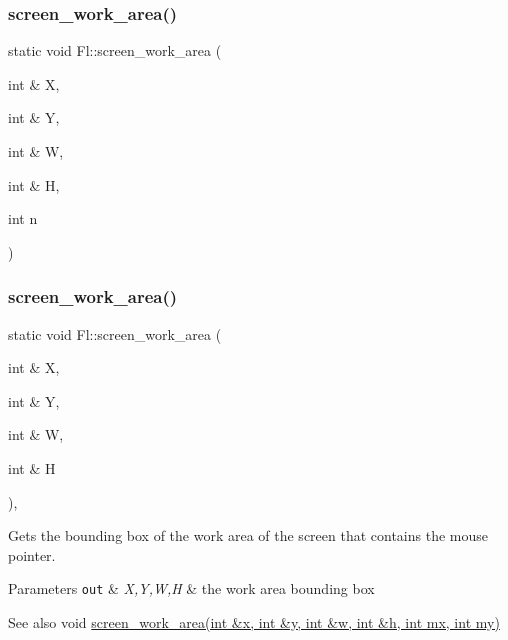 \subsubsection{\texorpdfstring{screen\+\_\+work\+\_\+area()}{screen\_work\_area()}\hspace{0.1cm}{\footnotesize\ttfamily [2/3]}}
{\footnotesize\ttfamily static void Fl\+::screen\+\_\+work\+\_\+area (\begin{DoxyParamCaption}\item[{int \&}]{X,  }\item[{int \&}]{Y,  }\item[{int \&}]{W,  }\item[{int \&}]{H,  }\item[{int}]{n }\end{DoxyParamCaption})\hspace{0.3cm}{\ttfamily [static]}}

\mbox{\label{group__fl__screen_gaf5d57c7b30d0b6e8adaa44027b89255e}} 
\subsubsection{\texorpdfstring{screen\+\_\+work\+\_\+area()}{screen\_work\_area()}\hspace{0.1cm}{\footnotesize\ttfamily [3/3]}}
{\footnotesize\ttfamily static void Fl\+::screen\+\_\+work\+\_\+area (\begin{DoxyParamCaption}\item[{int \&}]{X,  }\item[{int \&}]{Y,  }\item[{int \&}]{W,  }\item[{int \&}]{H }\end{DoxyParamCaption})\hspace{0.3cm}{\ttfamily [inline]}, {\ttfamily [static]}}

Gets the bounding box of the work area of the screen that contains the mouse pointer. 
\begin{DoxyParams}[1]{Parameters}
\mbox{\tt out}  & {\em X,Y,W,H} & the work area bounding box \\
\hline
\end{DoxyParams}
\begin{DoxySeeAlso}{See also}
void \hyperlink{group__fl__screen_ga9b70830f6c3b7829897841f4165afc5f}{screen\+\_\+work\+\_\+area(int \&x, int \&y, int \&w, int \&h, int mx, int my)} 
\end{DoxySeeAlso}
\mbox{\label{group__fl__screen_ga510d26cb2d6ec0688cf1eb8c5d9e5a1e}} 
